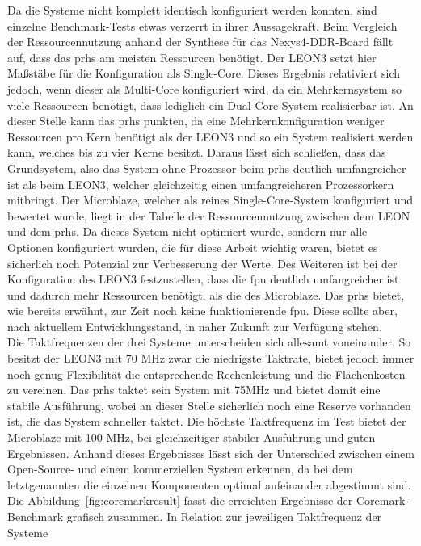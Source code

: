 Da die Systeme nicht komplett identisch konfiguriert werden konnten, sind einzelne Benchmark-Tests etwas verzerrt in ihrer Aussagekraft. Beim Vergleich der Ressourcennutzung
anhand der Synthese für das Nexys4-DDR-Board fällt auf, dass das \ac{prhs} am meisten Ressourcen benötigt. Der LEON3 setzt hier Maßstäbe für die Konfiguration als
Single-Core. Dieses Ergebnis relativiert sich jedoch, wenn dieser als Multi-Core konfiguriert wird, da ein Mehrkernsystem so viele Ressourcen benötigt, dass lediglich
ein Dual-Core-System realisierbar ist. An dieser Stelle kann das \ac{prhs} punkten, da eine Mehrkernkonfiguration weniger Ressourcen pro Kern benötigt als der LEON3 und so
ein System realisiert werden kann, welches bis zu vier Kerne besitzt. Daraus lässt sich schließen, dass das Grundsystem, also das System ohne Prozessor beim \ac{prhs}
deutlich umfangreicher ist als beim LEON3, welcher gleichzeitig einen umfangreicheren Prozessorkern mitbringt. Der Microblaze, welcher als reines Single-Core-System
konfiguriert und bewertet wurde, liegt in der Tabelle der Ressourcennutzung zwischen dem LEON und dem \ac{prhs}. Da dieses System nicht optimiert wurde, sondern
nur alle Optionen konfiguriert wurden, die für diese Arbeit wichtig waren, bietet es sicherlich noch Potenzial zur Verbesserung der Werte.
Des Weiteren ist bei der Konfiguration des LEON3 festzustellen, dass die \ac{fpu} deutlich umfangreicher ist und dadurch mehr Ressourcen benötigt, als die des Microblaze.
Das \ac{prhs} bietet, wie bereits erwähnt, zur Zeit noch keine funktionierende \ac{fpu}. Diese sollte aber, nach aktuellem Entwicklungsstand, in naher Zukunft zur Verfügung stehen.\\
Die Taktfrequenzen der drei Systeme unterscheiden sich allesamt voneinander. So besitzt der LEON3 mit 70 MHz zwar die niedrigste Taktrate, bietet jedoch immer noch genug
Flexibilität die entsprechende Rechenleistung und die Flächenkosten zu vereinen. Das \ac{prhs} taktet sein System mit 75MHz und bietet damit eine stabile Ausführung,
wobei an dieser Stelle sicherlich noch eine Reserve vorhanden ist, die das System schneller taktet. Die höchste Taktfrequenz im Test bietet der Microblaze mit 100 MHz, bei
gleichzeitiger stabiler Ausführung und guten Ergebnissen. Anhand dieses Ergebnisses lässt sich der Unterschied zwischen einem Open-Source- und einem kommerziellen System erkennen,
da bei dem letztgenannten die einzelnen Komponenten optimal aufeinander abgestimmt sind.\\
Die Abbildung~\ref{fig:coremarkresult} fasst die erreichten Ergebnisse der Coremark-Benchmark grafisch zusammen. In Relation zur jeweiligen Taktfrequenz der Systeme
